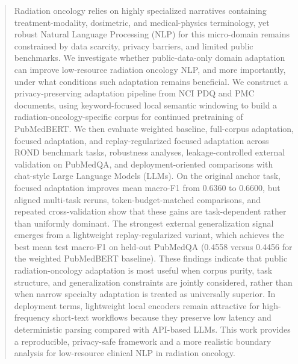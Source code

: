 \documentclass[a4paper,fleqn]{cas-dc}
\begin{document}
\begin{abstract}	
Radiation oncology relies on highly specialized narratives containing treatment-modality, dosimetric, and medical-physics terminology, yet robust Natural Language Processing (NLP) for this micro-domain remains constrained by data scarcity, privacy barriers, and limited public benchmarks. We investigate whether public-data-only domain adaptation can improve low-resource radiation oncology NLP, and more importantly, under what conditions such adaptation remains beneficial. We construct a privacy-preserving adaptation pipeline from NCI PDQ and PMC documents, using keyword-focused local semantic windowing to build a radiation-oncology-specific corpus for continued pretraining of PubMedBERT. We then evaluate weighted baseline, full-corpus adaptation, focused adaptation, and replay-regularized focused adaptation across ROND benchmark tasks, robustness analyses, leakage-controlled external validation on PubMedQA, and deployment-oriented comparisons with chat-style Large Language Models (LLMs). On the original anchor task, focused adaptation improves mean macro-F1 from 0.6360 to 0.6600, but aligned multi-task reruns, token-budget-matched comparisons, and repeated cross-validation show that these gains are task-dependent rather than uniformly dominant. The strongest external generalization signal emerges from a lightweight replay-regularized variant, which achieves the best mean test macro-F1 on held-out PubMedQA (0.4558 versus 0.4456 for the weighted PubMedBERT baseline). These findings indicate that public radiation-oncology adaptation is most useful when corpus purity, task structure, and generalization constraints are jointly considered, rather than when narrow specialty adaptation is treated as universally superior. In deployment terms, lightweight local encoders remain attractive for high-frequency short-text workflows because they preserve low latency and deterministic parsing compared with API-based LLMs. This work provides a reproducible, privacy-safe framework and a more realistic boundary analysis for low-resource clinical NLP in radiation oncology.
\end{abstract}


\end{document}
